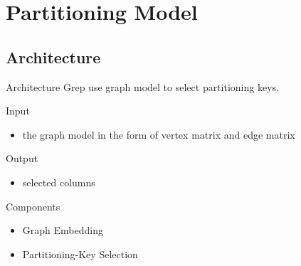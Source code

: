 \documentclass{beamer}
\begin{document}
\section{Partitioning Model}
\subsection{Architecture}
\begin{frame}{Architecture}
    Grep use graph model to select partitioning keys.

    \begin{exampleblock}{Input}
        \begin{itemize}
            \item the graph model in the form of vertex matrix and edge matrix
        \end{itemize}
    \end{exampleblock}
    \begin{exampleblock}{Output}
        \begin{itemize}
            \item selected columns
        \end{itemize}
    \end{exampleblock}
    \begin{exampleblock}{Components}
        \begin{itemize}
            \item Graph Embedding
            \item Partitioning-Key Selection
        \end{itemize}
    \end{exampleblock}
\end{frame}
\end{document}
